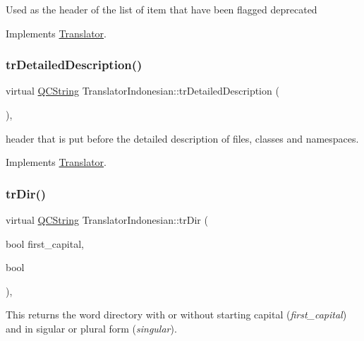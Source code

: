 Used as the header of the list of item that have been flagged deprecated 

Implements \mbox{\hyperlink{class_translator}{Translator}}.

\mbox{\label{class_translator_indonesian_a61b4472165da38729763798f16b9d428}} 
\subsubsection{\texorpdfstring{trDetailedDescription()}{trDetailedDescription()}}
{\footnotesize\ttfamily virtual \mbox{\hyperlink{class_q_c_string}{Q\+C\+String}} Translator\+Indonesian\+::tr\+Detailed\+Description (\begin{DoxyParamCaption}{ }\end{DoxyParamCaption})\hspace{0.3cm}{\ttfamily [inline]}, {\ttfamily [virtual]}}

header that is put before the detailed description of files, classes and namespaces. 

Implements \mbox{\hyperlink{class_translator}{Translator}}.

\mbox{\label{class_translator_indonesian_acabd31f296daa0346282ce7e3128cc41}} 
\subsubsection{\texorpdfstring{trDir()}{trDir()}}
{\footnotesize\ttfamily virtual \mbox{\hyperlink{class_q_c_string}{Q\+C\+String}} Translator\+Indonesian\+::tr\+Dir (\begin{DoxyParamCaption}\item[{bool}]{first\+\_\+capital,  }\item[{bool}]{ }\end{DoxyParamCaption})\hspace{0.3cm}{\ttfamily [inline]}, {\ttfamily [virtual]}}

This returns the word directory with or without starting capital ({\itshape first\+\_\+capital}) and in sigular or plural form ({\itshape singular}). 

